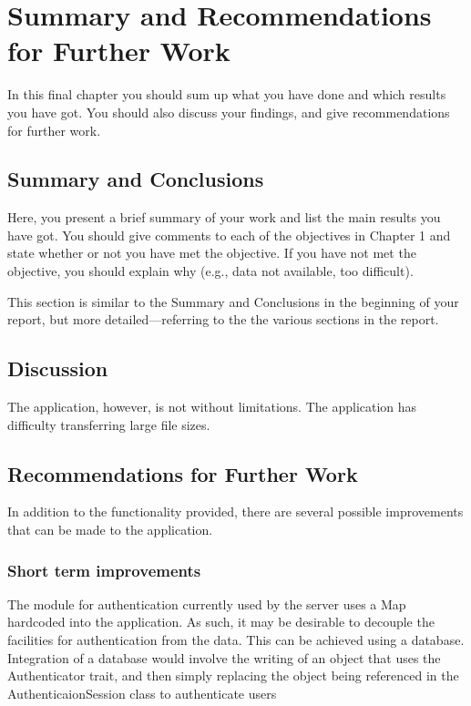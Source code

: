 \chapter[Summary]{Summary and Recommendations for Further Work}

In this final chapter you should sum up what you have done and which results you have got. You should also discuss your findings, and give recommendations for further work.

\section{Summary and Conclusions}
Here, you present a brief summary of your work and list the main results you have got. You should give comments to each of the objectives in Chapter 1 and state whether or not you have met the objective. If you have not met the objective, you should explain why (e.g., data not available, too difficult).

This section is similar to the Summary and Conclusions in the beginning of your report, but more detailed---referring to the the various sections in the report.

\section{Discussion}

The application, however, is not without limitations. The application has difficulty transferring large file sizes.

\section{Recommendations for Further Work}

In addition to the functionality provided, there are several possible improvements that can be made to the application.

\subsection{Short term improvements}
The module for authentication currently used by the server uses a Map hardcoded into the application. As such, it may be desirable to decouple the facilities for authentication from the data. This can be achieved using a database. Integration of a database would involve the writing of an object  that uses the Authenticator trait, and then simply replacing the object being referenced in the AuthenticaionSession class to authenticate users

